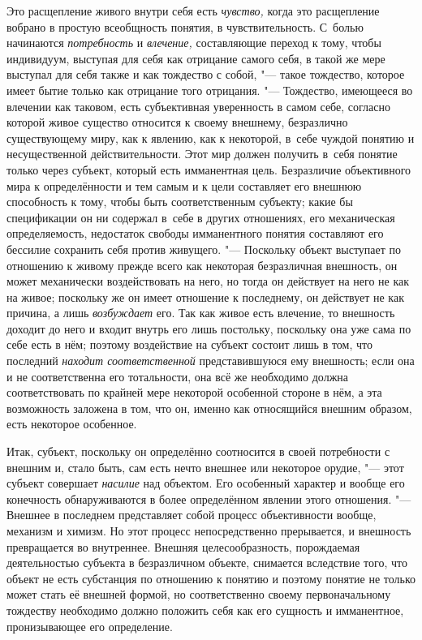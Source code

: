 Это расщепление живого внутри себя есть
{\em чувство,} когда это
расщепление вобрано в простую всеобщность понятия, в чувствительность.
С~болью начинаются {\em потребность}
и {\em влечение,}
составляющие переход к тому, чтобы индивидуум, выступая для
себя как отрицание самого себя, в такой же мере выступал для себя также и
как тождество с собой, "--- такое тождество, которое имеет
бытие только как отрицание того отрицания. "--- Тождество,
имеющееся во влечении как таковом, есть субъективная уверенность в самом
себе, согласно которой живое существо относится к своему внешнему,
безразлично существующему миру, как к явлению, как к некоторой, в~себе
чуждой понятию и несущественной действительности. Этот мир
должен получить в~себя понятие только через субъект, который
есть имманентная цель. Безразличие объективного мира к определённости и тем
самым и к цели составляет его внешнюю способность к тому, чтобы быть
соответственным субъекту; какие бы спецификации он ни содержал в~себе в
других отношениях, его механическая определяемость, недостаток свободы
имманентного понятия составляют его бессилие сохранить себя против
живущего. "--- Поскольку объект выступает по отношению к живому
прежде всего как некоторая безразличная внешность, он может механически
воздействовать на него, но тогда он действует на него не как на живое;
поскольку же он имеет отношение к последнему, он действует не как причина,
а лишь {\em возбуждает}
его. Так как живое есть влечение, то внешность доходит до
него и входит внутрь его лишь постольку, поскольку она уже сама по себе
есть в нём; поэтому воздействие на субъект состоит лишь в том, что
последний {\em находит соответственной}
представившуюся ему внешность; если она и не соответственна
его тотальности, она всё же необходимо должна соответствовать по крайней
мере некоторой особенной стороне в нём, а эта возможность заложена в том,
что он, именно как относящийся внешним образом, есть некоторое особенное.

Итак, субъект, поскольку он определённо соотносится в своей
потребности с внешним и, стало быть, сам есть нечто внешнее или некоторое
орудие, "--- этот субъект совершает
{\em насилие} над
объектом. Его особенный характер и вообще его конечность обнаруживаются в
более определённом явлении этого отношения. "--- Внешнее в
последнем представляет собой процесс объективности вообще, механизм и
химизм. Но этот процесс непосредственно прерывается, и внешность
превращается во внутреннее. Внешняя целесообразность, порождаемая
деятельностью субъекта в безразличном объекте, снимается вследствие того,
что объект не есть субстанция по отношению к понятию и поэтому понятие не
только может стать её внешней формой, но соответственно своему
первоначальному тождеству необходимо должно положить себя как его сущность
и имманентное, пронизывающее его определение.

